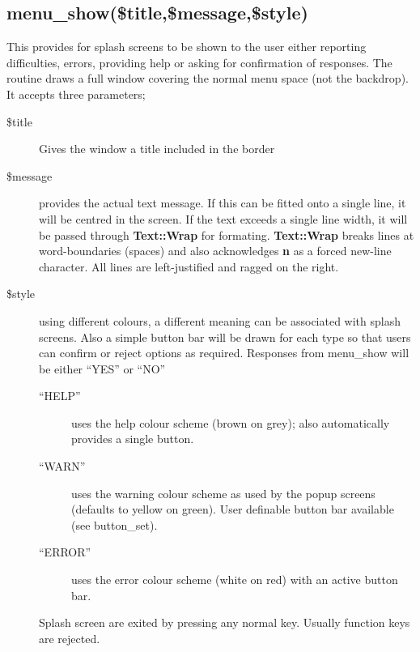 \documentclass[a4paper]{scrartcl}
\begin{document}
\subsection{menu\_show(\$title,\$message,\$style)} 
This provides for splash screens to be shown to the user either reporting difficulties, errors, providing help or asking for confirmation of responses. The routine draws a full window covering the normal menu space (not the backdrop). It accepts three parameters;
\begin{description}
\item [\$title] Gives the window a title included in the border
\item [\$message] provides the actual text message. If this can be fitted onto a single line, it will be centred in the screen. If the text exceeds a single line width, it will be passed through \textbf{Text::Wrap} for formating. \textbf{Text::Wrap} breaks lines at word-boundaries (spaces) and also acknowledges \textbf{n} as a forced new-line character. All lines are left-justified and ragged on the right.
\item [\$style] using different colours, a different meaning can be associated with splash screens. Also a simple button bar will be drawn for each type so that users can confirm or reject options as required. Responses from menu\_show will be either ``YES'' or ``NO''
\begin{description}
\item [``HELP''] uses the help colour scheme (brown on grey); also automatically provides a single button.
\item [``WARN''] uses the warning colour scheme as used by the popup screens (defaults to yellow on green). User definable button bar available (see button\_set).
\item [``ERROR''] uses the error colour scheme (white on red) with an active button bar.
\end{description}
Splash screen are exited by pressing any normal key. Usually function keys are rejected.
\end{description}
\end{document}
